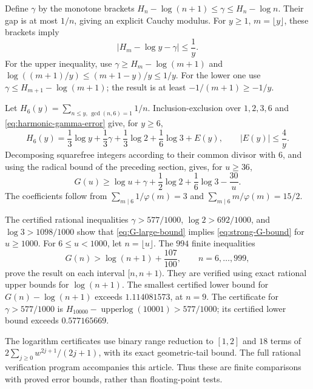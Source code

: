 Define $\gamma$ by the monotone brackets
$H_n-\log(n+1)\leq\gamma\leq H_n-\log n$.
Their gap is at most $1/n$, giving an explicit Cauchy modulus.
For $y\geq1$, $m=\lfloor y\rfloor$, these brackets imply
\begin{equation}
 |H_m-\log y-\gamma|\leq\frac1y.
 \label{eq:harmonic-gamma-error}
\end{equation}
For the upper inequality, use
$\gamma\geq H_m-\log(m+1)$ and
$\log((m+1)/y)\leq(m+1-y)/y\leq1/y$.
For the lower one use
$\gamma\leq H_{m+1}-\log(m+1)$; the result is at least
$-1/(m+1)\geq-1/y$.

Let $H_6(y)=\sum_{n\leq y,\,\gcd(n,6)=1}1/n$.
Inclusion-exclusion over $1,2,3,6$ and
\eqref{eq:harmonic-gamma-error} give, for $y\geq6$,
\[
 H_6(y)=\frac13\log y+\frac13\gamma
       +\frac13\log2+\frac16\log3+E(y),
 \qquad |E(y)|\leq\frac4y.
\]
Decomposing squarefree integers according to their common divisor
with $6$, and using the radical bound of the preceding section,
gives, for $u\geq36$,
\begin{equation}
 G(u)\geq\log u+\gamma+\frac12\log2+\frac16\log3-\frac{30}{u}.
 \label{eq:G-large-bound}
\end{equation}
The coefficients follow from
$\sum_{m\mid6}1/\varphi(m)=3$ and
$\sum_{m\mid6}m/\varphi(m)=15/2$.

The certified rational inequalities
$\gamma>577/1000$, $\log2>692/1000$, and
$\log3>1098/1000$ show that
\eqref{eq:G-large-bound} implies \eqref{eq:strong-G-bound} for
$u\geq1000$.  For $6\leq u<1000$, let $n=\lfloor u\rfloor$.
The $994$ finite inequalities
\begin{equation}
 G(n)>\log(n+1)+\frac{107}{100},
 \qquad n=6,\ldots,999,
 \label{eq:G-finite-certificate}
\end{equation}
prove the result on each interval $[n,n+1)$.
They are verified using exact rational upper bounds for
$\log(n+1)$.  The smallest certified lower bound for
$G(n)-\log(n+1)$ exceeds $1.114081573$, at $n=9$.
The certificate for $\gamma>577/1000$ is
$H_{10000}-\operatorname{upperlog}(10001)>577/1000$;
its certified lower bound exceeds $0.577165669$.

The logarithm certificates use binary range reduction to $[1,2]$
and $18$ terms of
$2\sum_{j\geq0}w^{2j+1}/(2j+1)$, with its exact geometric-tail
bound.  The full rational verification program accompanies this
article.  Thus these are finite comparisons with proved error
bounds, rather than floating-point tests.

